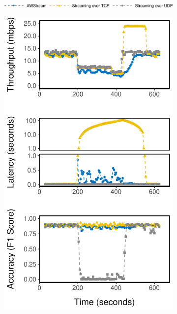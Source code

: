 \begin{figure}
  \begin{subfigure}{\linewidth}
    \centering
    \includegraphics[width=0.9\columnwidth]{figures/runtime-legend.pdf}
  \end{subfigure}

  \begin{subfigure}{0.3\textwidth}
    \centering
    \includegraphics[width=\textwidth]{figures/runtime-mot-verticle.pdf}

\end{subfigure}
\end{figure}
